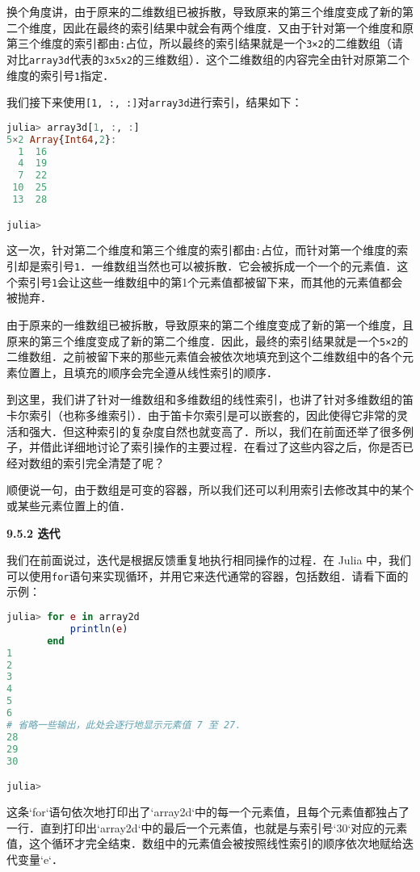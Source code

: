换个角度讲，由于原来的二维数组已被拆散，导致原来的第三个维度变成了新的第二个维度，因此在最终的索引结果中就会有两个维度．又由于针对第一个维度和原第三个维度的索引都由\verb|:|占位，所以最终的索引结果就是一个\verb|3×2|的二维数组（请对比\verb|array3d|代表的\verb|3x5x2|的三维数组）．这个二维数组的内容完全由针对原第二个维度的索引号\verb|1|指定．

我们接下来使用\verb|[1, :, :]|对\verb|array3d|进行索引，结果如下：

\begin{lstlisting}[language=julia]
julia> array3d[1, :, :]
5×2 Array{Int64,2}:
  1  16
  4  19
  7  22
 10  25
 13  28

julia> 
\end{lstlisting}

这一次，针对第二个维度和第三个维度的索引都由\verb|:|占位，而针对第一个维度的索引却是索引号\verb|1|．一维数组当然也可以被拆散．它会被拆成一个一个的元素值．这个索引号\verb|1|会让这些一维数组中的第1个元素值都被留下来，而其他的元素值都会被抛弃．

由于原来的一维数组已被拆散，导致原来的第二个维度变成了新的第一个维度，且原来的第三个维度变成了新的第二个维度．因此，最终的索引结果就是一个\verb|5×2|的二维数组．之前被留下来的那些元素值会被依次地填充到这个二维数组中的各个元素位置上，且填充的顺序会完全遵从线性索引的顺序．

到这里，我们讲了针对一维数组和多维数组的线性索引，也讲了针对多维数组的笛卡尔索引（也称多维索引）．由于笛卡尔索引是可以嵌套的，因此使得它非常的灵活和强大．但这种索引的复杂度自然也就变高了．所以，我们在前面还举了很多例子，并借此详细地讨论了索引操作的主要过程．在看过了这些内容之后，你是否已经对数组的索引完全清楚了呢？

顺便说一句，由于数组是可变的容器，所以我们还可以利用索引去修改其中的某个或某些元素位置上的值．

\textbf{9.5.2 迭代}

我们在前面说过，迭代是根据反馈重复地执行相同操作的过程．在 Julia 中，我们可以使用\verb|for|语句来实现循环，并用它来迭代通常的容器，包括数组．请看下面的示例：

\begin{lstlisting}[language=julia]
julia> for e in array2d
           println(e)
       end
1
2
3
4
5
6
# 省略一些输出，此处会逐行地显示元素值 7 至 27．
28
29
30

julia> 
\end{lstlisting}

这条`for`语句依次地打印出了`array2d`中的每一个元素值，且每个元素值都独占了一行．直到打印出`array2d`中的最后一个元素值，也就是与索引号`30`对应的元素值，这个循环才完全结束．数组中的元素值会被按照线性索引的顺序依次地赋给迭代变量`e`．


